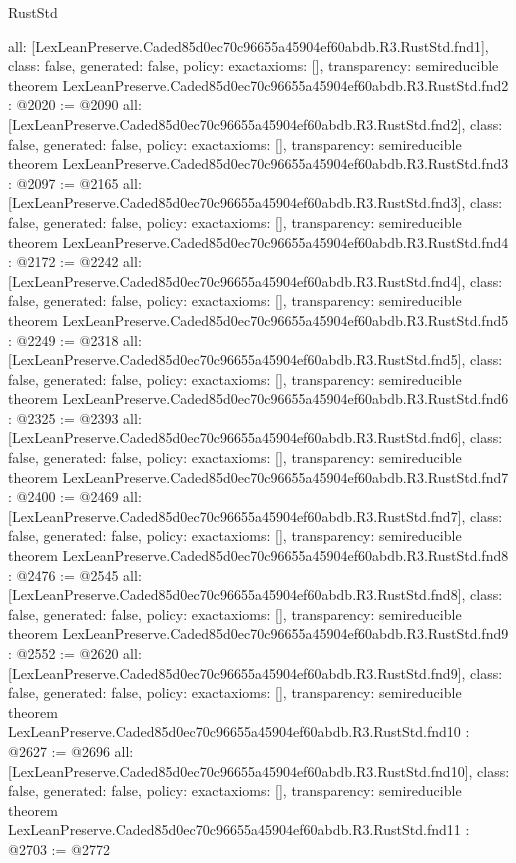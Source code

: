 \begin{lexlean}{RustStd}
\begin{coremodule}
{  all: [LexLeanPreserve.Caded85d0ec70c96655a45904ef60abdb.R3.RustStd.fnd1],
  class: false,
  generated: false,
  policy: exact{axioms: []},
  transparency: semireducible
}
theorem LexLeanPreserve.Caded85d0ec70c96655a45904ef60abdb.R3.RustStd.fnd2 : @2020 := @2090 {
  all: [LexLeanPreserve.Caded85d0ec70c96655a45904ef60abdb.R3.RustStd.fnd2],
  class: false,
  generated: false,
  policy: exact{axioms: []},
  transparency: semireducible
}
theorem LexLeanPreserve.Caded85d0ec70c96655a45904ef60abdb.R3.RustStd.fnd3 : @2097 := @2165 {
  all: [LexLeanPreserve.Caded85d0ec70c96655a45904ef60abdb.R3.RustStd.fnd3],
  class: false,
  generated: false,
  policy: exact{axioms: []},
  transparency: semireducible
}
theorem LexLeanPreserve.Caded85d0ec70c96655a45904ef60abdb.R3.RustStd.fnd4 : @2172 := @2242 {
  all: [LexLeanPreserve.Caded85d0ec70c96655a45904ef60abdb.R3.RustStd.fnd4],
  class: false,
  generated: false,
  policy: exact{axioms: []},
  transparency: semireducible
}
theorem LexLeanPreserve.Caded85d0ec70c96655a45904ef60abdb.R3.RustStd.fnd5 : @2249 := @2318 {
  all: [LexLeanPreserve.Caded85d0ec70c96655a45904ef60abdb.R3.RustStd.fnd5],
  class: false,
  generated: false,
  policy: exact{axioms: []},
  transparency: semireducible
}
theorem LexLeanPreserve.Caded85d0ec70c96655a45904ef60abdb.R3.RustStd.fnd6 : @2325 := @2393 {
  all: [LexLeanPreserve.Caded85d0ec70c96655a45904ef60abdb.R3.RustStd.fnd6],
  class: false,
  generated: false,
  policy: exact{axioms: []},
  transparency: semireducible
}
theorem LexLeanPreserve.Caded85d0ec70c96655a45904ef60abdb.R3.RustStd.fnd7 : @2400 := @2469 {
  all: [LexLeanPreserve.Caded85d0ec70c96655a45904ef60abdb.R3.RustStd.fnd7],
  class: false,
  generated: false,
  policy: exact{axioms: []},
  transparency: semireducible
}
theorem LexLeanPreserve.Caded85d0ec70c96655a45904ef60abdb.R3.RustStd.fnd8 : @2476 := @2545 {
  all: [LexLeanPreserve.Caded85d0ec70c96655a45904ef60abdb.R3.RustStd.fnd8],
  class: false,
  generated: false,
  policy: exact{axioms: []},
  transparency: semireducible
}
theorem LexLeanPreserve.Caded85d0ec70c96655a45904ef60abdb.R3.RustStd.fnd9 : @2552 := @2620 {
  all: [LexLeanPreserve.Caded85d0ec70c96655a45904ef60abdb.R3.RustStd.fnd9],
  class: false,
  generated: false,
  policy: exact{axioms: []},
  transparency: semireducible
}
theorem LexLeanPreserve.Caded85d0ec70c96655a45904ef60abdb.R3.RustStd.fnd10 : @2627 := @2696 {
  all: [LexLeanPreserve.Caded85d0ec70c96655a45904ef60abdb.R3.RustStd.fnd10],
  class: false,
  generated: false,
  policy: exact{axioms: []},
  transparency: semireducible
}
theorem LexLeanPreserve.Caded85d0ec70c96655a45904ef60abdb.R3.RustStd.fnd11 : @2703 := @2772 {
}
\end{coremodule}
\end{lexlean}
